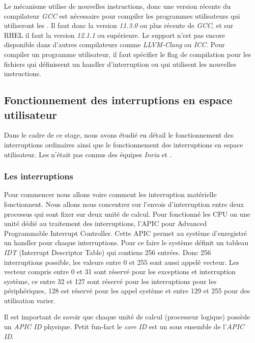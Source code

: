 Le mécanisme utilise de nouvelles instructions, donc une version récente du compilateur \emph{GCC} est nécessaire pour compiler les programmes utilisateurs qui utiliseront les \uintr{}.
Il faut donc la version \emph{11.3.0} ou plus récente de \emph{GCC}, et sur RHEL il faut la version \emph{12.1.1} ou supérieure.
Le support n'est pas encore disponible dans d'autres compilateurs comme \emph{LLVM-Clang} ou \emph{ICC}.
Pour compiler un programme utilisateur, il faut spécifier le flag de compilation  pour les fichiers qui définissent un handler d'interruption ou qui utilisent les nouvelles instructions.

\subsection{Fonctionnement des interruptions en espace utilisateur}
\label{sec:uintr}

Dans le cadre de ce stage, nous avons étudié en détail le fonctionnement des interruptions ordinaires ainsi que le fonctionnement des interruptions en espace utilisateur.
Les \uintr{} n'était pas connus des équipes \emph{Inria} et \atos{}.

\subsubsection{Les interruptions}
\label{sec:interrupts}

Pour commencer nous allons voire comment les interruption matérielle fonctionnent.
Nous allons nous concentrer sur l'envois d'interruption entre deux processus qui sont fixer sur deux unité de calcul.
Pour fonctionné les CPU on une unité dédié au traitement des interruptions, l'APIC pour Advanced Programmable Interrupt Controller.
Cette APIC permet au système d'enregistré un handler pour chaque interruptions.
Pour ce faire le système définit un tableau \emph{IDT} (Interrupt Descriptor Table) qui contiens 256 entrées.
Donc 256 interruptions possible, les valeurs entre 0 et 255 sont aussi appelé vecteur.
Les vecteur compris entre 0 et 31 sont réservé pour les exceptions et interruption système, ce entre 32 et 127 sont réservé pour les interruptions pour les périphériques,
128 est réservé pour les appel système et entre 129 et 255 pour des utilisation varier.

Il est important de savoir que chaque unité de calcul (processeur logique) possède un \emph{APIC ID} physique.
Petit fun-fact le \emph{core ID} est un sous ensemble de l'\emph{APIC ID}.


